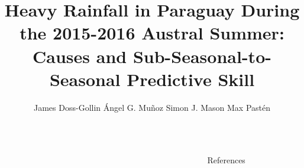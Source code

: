 \documentclass[serif,mathserif,final]{beamer}
\title{Heavy Rainfall in Paraguay During the 2015-2016 Austral Summer: Causes and Sub-Seasonal-to-Seasonal Predictive Skill}
\author{James Doss-Gollin\inst{1} \quad \'{A}ngel G. Mu\~{n}oz\inst{2,3} \quad Simon J. Mason\inst{3} \quad Max Past\'{e}n\inst{4}}
\institute
{\inst{1} Columbia Water Center, Columbia University \inst{2} AOS, Princeton University \inst{3} International Research Institute for Climate and Society, Columbia University \inst{4} Direcci\'{o}n de Meteorolog\'{i}a e Hidrolog\'{i}a, Paraguay}
\begin{document}
\begin{frame}{}
  \begin{columns}[t]

    \begin{column}{0.22\linewidth}

        
        

    \end{column}%

    \begin{column}{0.22\linewidth}

      
        

    \end{column}%

    \begin{column}{0.22\linewidth}

      
      

    \end{column}%


    \begin{column}{0.22\linewidth}

      
      

      \begin{block}{References}
          \renewcommand*{\bibfont}{\footnotesize}
          \printbibliography[heading=none]
      \end{block}

    \end{column}%

  \end{columns}
\end{frame}
\end{document}

